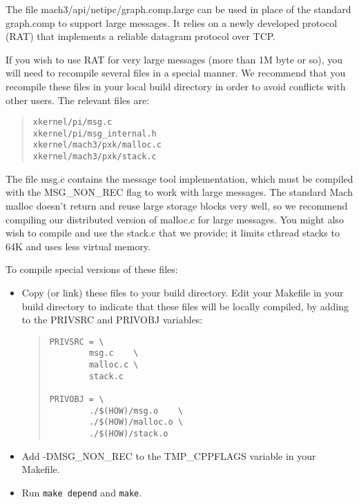 The file {\sanss mach3/api/netipc/graph.comp.large} can be used in 
place of the
standard graph.comp to support large messages.  It relies on
a newly developed protocol (RAT) that implements a reliable datagram
protocol over TCP.

If you wish to 
use RAT for very large messages (more than 1M byte or so), you will
need to recompile several \xk{} files in a special manner.  We
recommend that you recompile these files in your local build
directory in order to avoid conflicts with other users.  The relevant
files are:

\begin{quote}
\begin{verbatim}
xkernel/pi/msg.c
xkernel/pi/msg_internal.h
xkernel/mach3/pxk/malloc.c
xkernel/mach3/pxk/stack.c
\end{verbatim}
\end{quote}

\noindent
The file {\sanss msg.c} contains the message tool implementation,
which must be compiled with the MSG\_NON\_REC flag to work with large
messages.  The standard Mach malloc doesn't return and reuse large
storage blocks very well, so we recommend compiling our distributed
version of {\sanss malloc.c} for large messages.  
You might also wish to compile and use the {\sanss stack.c}
that we provide; it limits cthread stacks to 64K and
uses less virtual memory.

To compile special versions of these files:

\begin{itemize}

\item{}
Copy (or link) these files to your build directory.  Edit your
Makefile in your build directory to indicate that these files will be
locally compiled, by adding to the PRIVSRC and PRIVOBJ variables:

\begin{quote}
\begin{verbatim}
PRIVSRC = \
        msg.c    \
        malloc.c \
        stack.c  

PRIVOBJ = \
        ./$(HOW)/msg.o    \
        ./$(HOW)/malloc.o \
        ./$(HOW)/stack.o
\end{verbatim}
\end{quote}

\item{}
Add -DMSG\_NON\_REC to the TMP\_CPPFLAGS variable in your Makefile.

\item{}
Run {\tt make depend} and {\tt make}.  

\end{itemize}




